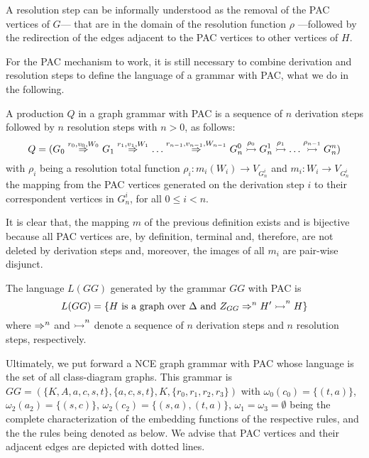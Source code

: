 \documentclass[]{report}
\begin{document}
A resolution step can be informally understood as the removal of the PAC vertices of $G$--- that are in the domain of the resolution function $\rho$ ---followed by the redirection of the edges adjacent to the PAC vertices to other vertices of $H$.

For the PAC mechanism to work, it is still necessary to combine derivation and resolution steps to define the language of a grammar with PAC, what we do in the following.

\begin{definition}
	A production $Q$ in a graph grammar with PAC is a sequence of $n$ derivation steps followed by $n$ resolution steps with $n > 0$, as follows:
	\begin{equation*}
		Q = (G_0 \overset{r_0,v_0,W_0}{\Rightarrow}_{} G_1 \overset{r_1,v_1,W_1}{\Rightarrow}_{} \dots \overset{r_{n-1},v_{n-1},W_{n-1}}{\Rightarrow}_{} G_n^0 \overset{\rho_0}{\rightarrowtail} G_n^1 \overset{\rho_1}{\rightarrowtail} \dots \overset{\rho_{n-1}}{\rightarrowtail} G_n^n)
	\end{equation*}
	with $\rho_i$ being a resolution total function $\rho_i : m_i(W_i) \to V_{G_n^i}$ and $m_i : W_i \to V_{G_n^i}$ the mapping from the PAC vertices generated on the derivation step $i$ to their correspondent vertices in $G_n^i$, for all $0 \le i < n$.
\end{definition}

It is clear that, the mapping $m$ of the previous definition exists and is bijective because all PAC vertices are, by definition, terminal and, therefore, are not deleted by derivation steps and, moreover, the images of all $m_i$ are pair-wise disjunct.

\begin{definition}
	The language $L(GG)$ generated by the grammar $GG$ with PAC is
	\begin{equation*}
		L(GG) = \{ H \text{ is a graph over } \Delta \text{ and } Z_{GG} \Rightarrow^{n}_{} H' \overset{}{\rightarrowtail}^{n} H \}
	\end{equation*}
	where $\Rightarrow^{n}_{}$ and $\overset{}{\rightarrowtail}^{n}$ denote a sequence of $n$ derivation steps and $n$ resolution steps, respectively.
\end{definition}

Ultimately, we put forward a NCE graph grammar with PAC whose language is the set of all class-diagram graphs. This grammar is $GG = (\{K, A, a, c, s, t\}, \{a, c, s, t\}, K, \{r_0, r_1, r_2, r_3\})$ with $\omega_0(c_0) = \{(t,a)\}$, $\omega_2(a_2) = \{(s,c)\}$, $\omega_2(c_2) = \{(s,a),(t,a)\}$, $\omega_1 = \omega_3 = \emptyset$ being the complete characterization of the embedding functions of the respective rules, and the the rules being denoted as below. We advise that PAC vertices and their adjacent edges are depicted with dotted lines.
\end{document}
